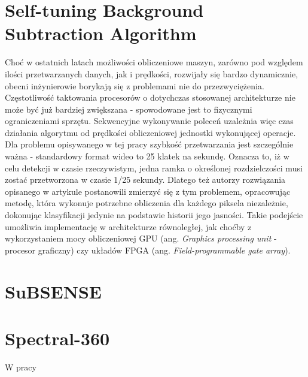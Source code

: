 \section{Self-tuning Background Subtraction Algorithm}
\label{sec:BinWang}
Choć w ostatnich latach możliwości obliczeniowe maszyn, zarówno pod względem ilości przetwarzanych danych, jak i prędkości, rozwijały się bardzo dynamicznie, obecni inżynierowie borykają się z problemami nie do przezwyciężenia. Częstotliwość taktowania procesorów o dotychczas stosowanej architekturze nie może być już bardziej zwiększana - spowodowane jest to fizycznymi ograniczeniami sprzętu. Sekwencyjne wykonywanie poleceń uzależnia więc czas działania algorytmu od prędkości obliczeniowej jednostki wykonującej operacje. Dla problemu opisywanego w tej pracy szybkość przetwarzania jest szczególnie ważna - standardowy format wideo to 25 klatek na sekundę. Oznacza to, iż w celu detekcji w czasie rzeczywistym, jedna ramka o określonej rozdzielczości musi zostać przetworzona w czasie 1/25 sekundy. Dlatego też autorzy rozwiązania opisanego w artykule \cite{6910012} postanowili zmierzyć się z tym problemem, opracowując metodę, która wykonuje potrzebne obliczenia dla każdego piksela niezależnie, dokonując klasyfikacji jedynie na podstawie historii jego jasności. Takie podejście umożliwia implementację w architekturze równoległej, jak choćby z wykorzystaniem mocy obliczeniowej GPU (ang. \textit{Graphics processing unit} - procesor graficzny) czy układów FPGA (ang. \textit{Field-programmable gate array}).

\section{SuBSENSE}
\cite{stflexible}
\section{Spectral-360}
W pracy \cite{6910013}


